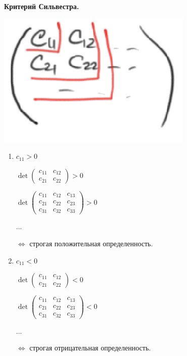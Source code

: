 \begin{statement}
    \textbf{Критерий Сильвестра.}

    \includegraphics[width=0.2\linewidth]{images/07-06-3.png}

    \begin{enumerate}
        \item $c_{11} > 0$

            $\det \begin{pmatrix}
                   c_{11} & c_{12} \\
                   c_{21} & c_{22}
             \end{pmatrix}>0$

             $\det \begin{pmatrix}
                   c_{11} & c_{12} & c_{13} \\
                   c_{21} & c_{22} & c_{23} \\
                   c_{31} & c_{32} & c_{33}
             \end{pmatrix}>0$

             ...

             $\Leftrightarrow$ строгая положительная определенность.
        \item $c_{11} < 0$

            $\det \begin{pmatrix}
                   c_{11} & c_{12} \\
                   c_{21} & c_{22}
             \end{pmatrix}<0$

             $\det \begin{pmatrix}
                   c_{11} & c_{12} & c_{13} \\
                   c_{21} & c_{22} & c_{23} \\
                   c_{31} & c_{32} & c_{33}
             \end{pmatrix}<0$

             ...

             $\Leftrightarrow$ строгая отрицательная определенность.
    \end{enumerate}
\end{statement}

